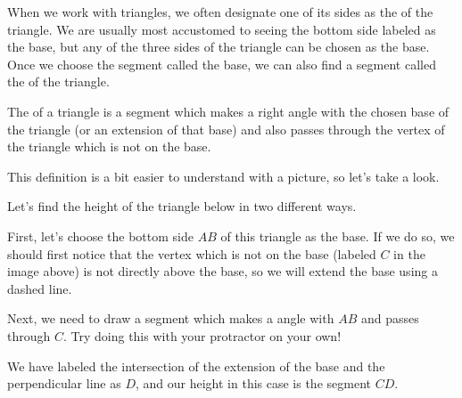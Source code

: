 \documentclass{ximera}
\begin{document}
When we work with triangles, we often designate one of its sides as the  of the triangle. We are usually most accustomed to seeing the bottom side labeled as the base, but any of the three sides of the triangle can be chosen as the base. Once we choose the segment called the base, we can also find a segment called the  of the triangle.
\begin{definition}
The  of a triangle is a segment which makes a right angle with the chosen base of the triangle (or an extension of that base) and also passes through the vertex of the triangle which is not on the base.
\end{definition}
This definition is a bit easier to understand with a picture, so let's take a look.
\begin{example}
Let's find the height of the triangle below in two different ways.
\begin{image}
\end{image}
First, let's choose the bottom side $AB$ of this triangle as the base. If we do so, we should first notice that the vertex which is not on the base (labeled $C$ in the image above) is not directly above the base, so we will extend the base using a dashed line.
\begin{image}
\end{image}
Next, we need to draw a segment which makes a  angle with $AB$ and passes through $C$. Try doing this with your protractor on your own!
\begin{image}
\end{image}
We have labeled the intersection of the extension of the base and the perpendicular line as $D$, and our height in this case is the segment $CD$.


\end{example}
\end{document}
